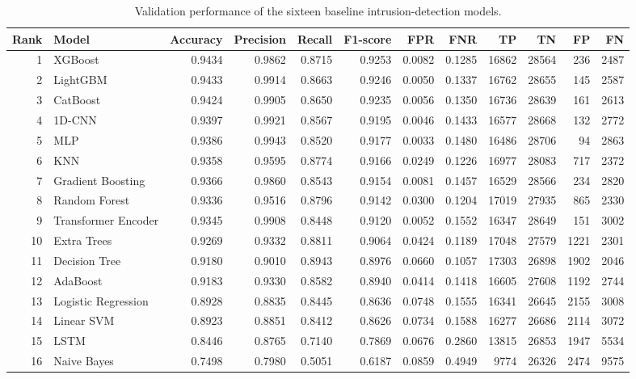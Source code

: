 \begin{table}
\caption{Validation performance of the sixteen baseline intrusion-detection models.}
\label{tab:baseline16}
\begin{tabular}{rlrrrrrrrrrr}
\toprule
Rank & Model & Accuracy & Precision & Recall & F1-score & FPR & FNR & TP & TN & FP & FN \\
\midrule
1 & XGBoost & 0.9434 & 0.9862 & 0.8715 & 0.9253 & 0.0082 & 0.1285 & 16862 & 28564 & 236 & 2487 \\
2 & LightGBM & 0.9433 & 0.9914 & 0.8663 & 0.9246 & 0.0050 & 0.1337 & 16762 & 28655 & 145 & 2587 \\
3 & CatBoost & 0.9424 & 0.9905 & 0.8650 & 0.9235 & 0.0056 & 0.1350 & 16736 & 28639 & 161 & 2613 \\
4 & 1D-CNN & 0.9397 & 0.9921 & 0.8567 & 0.9195 & 0.0046 & 0.1433 & 16577 & 28668 & 132 & 2772 \\
5 & MLP & 0.9386 & 0.9943 & 0.8520 & 0.9177 & 0.0033 & 0.1480 & 16486 & 28706 & 94 & 2863 \\
6 & KNN & 0.9358 & 0.9595 & 0.8774 & 0.9166 & 0.0249 & 0.1226 & 16977 & 28083 & 717 & 2372 \\
7 & Gradient Boosting & 0.9366 & 0.9860 & 0.8543 & 0.9154 & 0.0081 & 0.1457 & 16529 & 28566 & 234 & 2820 \\
8 & Random Forest & 0.9336 & 0.9516 & 0.8796 & 0.9142 & 0.0300 & 0.1204 & 17019 & 27935 & 865 & 2330 \\
9 & Transformer Encoder & 0.9345 & 0.9908 & 0.8448 & 0.9120 & 0.0052 & 0.1552 & 16347 & 28649 & 151 & 3002 \\
10 & Extra Trees & 0.9269 & 0.9332 & 0.8811 & 0.9064 & 0.0424 & 0.1189 & 17048 & 27579 & 1221 & 2301 \\
11 & Decision Tree & 0.9180 & 0.9010 & 0.8943 & 0.8976 & 0.0660 & 0.1057 & 17303 & 26898 & 1902 & 2046 \\
12 & AdaBoost & 0.9183 & 0.9330 & 0.8582 & 0.8940 & 0.0414 & 0.1418 & 16605 & 27608 & 1192 & 2744 \\
13 & Logistic Regression & 0.8928 & 0.8835 & 0.8445 & 0.8636 & 0.0748 & 0.1555 & 16341 & 26645 & 2155 & 3008 \\
14 & Linear SVM & 0.8923 & 0.8851 & 0.8412 & 0.8626 & 0.0734 & 0.1588 & 16277 & 26686 & 2114 & 3072 \\
15 & LSTM & 0.8446 & 0.8765 & 0.7140 & 0.7869 & 0.0676 & 0.2860 & 13815 & 26853 & 1947 & 5534 \\
16 & Naive Bayes & 0.7498 & 0.7980 & 0.5051 & 0.6187 & 0.0859 & 0.4949 & 9774 & 26326 & 2474 & 9575 \\
\bottomrule
\end{tabular}
\end{table}
